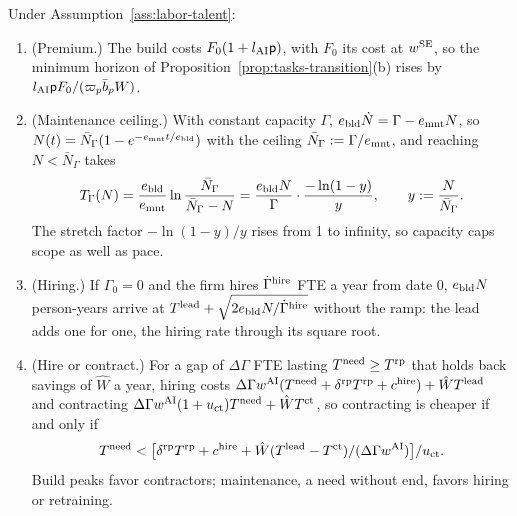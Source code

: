 \begin{proposition}\label{prop:labor-talent}
Under Assumption~\ref{ass:labor-talent}:
\begin{enumerate}
\item[(a)] (Premium.) The build costs $F_0(1+l_{\rm AI}\mathsf p)$, with $F_0$ its cost at $w^{\rm SE}$, so the minimum horizon of Proposition~\ref{prop:tasks-transition}(b) rises by $l_{\rm AI}\mathsf pF_0/(\varpi_p\bar b_pW)$.
\item[(b)] (Maintenance ceiling.) With constant capacity $\Gamma$, $e_{\rm bld}\dot N=\Gamma-e_{\rm mnt}N$, so $N(t)=\bar N_\Gamma(1-e^{-e_{\rm mnt}t/e_{\rm bld}})$ with the ceiling $\bar N_\Gamma:=\Gamma/e_{\rm mnt}$, and reaching $N<\bar N_\Gamma$ takes
\begin{equation}\label{eq:labor-TGamma}
T_\Gamma(N)=\frac{e_{\rm bld}}{e_{\rm mnt}}\ln\frac{\bar N_\Gamma}{\bar N_\Gamma-N}=\frac{e_{\rm bld}N}{\Gamma}\cdot\frac{-\ln(1-y)}{y},\qquad y:=\frac N{\bar N_\Gamma}.
\end{equation}
The stretch factor $-\ln(1-y)/y$ rises from 1 to infinity, so capacity caps scope as well as pace.
\item[(c)] (Hiring.) If $\Gamma_0=0$ and the firm hires $\dot\Gamma^{\rm hire}$ FTE a year from date 0, $e_{\rm bld}N$ person-years arrive at $T^{\rm lead}+\sqrt{2e_{\rm bld}N/\dot\Gamma^{\rm hire}}$ without the ramp: the lead adds one for one, the hiring rate through its square root.
\item[(d)] (Hire or contract.) For a gap of $\Delta\Gamma$ FTE lasting $T^{\rm need}\ge T^{\rm rp}$ that holds back savings of $\hat W$ a year, hiring costs $\Delta\Gamma w^{\rm AI}(T^{\rm need}+\delta^{\rm rp}T^{\rm rp}+c^{\rm hire})+\hat WT^{\rm lead}$ and contracting $\Delta\Gamma w^{\rm AI}(1+u_{\rm ct})T^{\rm need}+\hat WT^{\rm ct}$, so contracting is cheaper if and only if
\[
T^{\rm need}<\bigl[\delta^{\rm rp}T^{\rm rp}+c^{\rm hire}+\hat W(T^{\rm lead}-T^{\rm ct})/(\Delta\Gamma w^{\rm AI})\bigr]/u_{\rm ct}.
\]
Build peaks favor contractors; maintenance, a need without end, favors hiring or retraining.
\end{enumerate}
\end{proposition}

